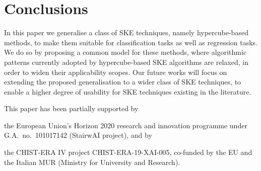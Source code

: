 \documentclass[
]{ceurart}
\begin{document}



\section{Conclusions}

In this paper we generalise a class of SKE techniques, namely hypercube-based methods, to make them suitable for classification tasks as well as regression tasks.
%
We do so by proposing a common model for these methods, %
%
where algorithmic patterns currently adopted by hypercube-based SKE algorithms are relaxed, in order to widen their applicability scopes.
%
Our future works will focus on extending the proposed generalisation to a wider class of SKE techniques, to enable a higher degree of usability for SKE techniques existing in the literature.

\begin{acknowledgments}
	This paper has been partially supported by
	\begin{inlinelist}
		\item the European Union's Horizon 2020 research and innovation programme under G.A.\ no.\ 101017142 (StairwAI project), and by
		\item the CHIST-ERA IV project CHIST-ERA-19-XAI-005, co-funded by the EU and the Italian MUR (Ministry for University and Research).
	\end{inlinelist}
\end{acknowledgments}


\end{document}
